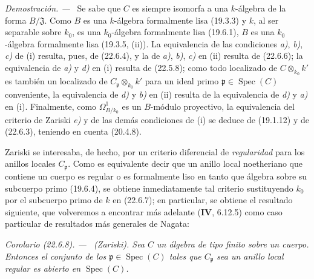 \documentclass[10pt,oneside]{book}
\makeatletter
\newcommand{\setmanualcurrentlabel}[1]{\def\@currentlabel{#1}}
\newenvironment{corollary}[1][]{%
  \setmanualcurrentlabel{#1}\par\medskip\noindent\itshape Corolario (#1). ---\ }{\par}
\newenvironment{proof}{%
  \par\medskip\noindent\textit{Demostración. ---\ }}{\par}
\makeatother
\begin{document}
\begin{proof}
Se sabe que $C$ es siempre isomorfa a una $k$-álgebra de la forma
$B/\mathfrak J$. Como $B$ es una $k$-álgebra formalmente lisa (19.3.3) y
$k$, al ser separable sobre $k_0$, es una $k_0$-álgebra formalmente lisa
(19.6.1), $B$ es una $k_0$-álgebra formalmente lisa (19.3.5, (ii)).
La equivalencia de las condiciones \emph{a)}, \emph{b)}, \emph{c)} de (i) resulta, pues, de (22.6.4), y
la de \emph{a)}, \emph{b)}, \emph{c)} en (ii) resulta de (22.6.6); la equivalencia de \emph{a)} y \emph{d)}
en (i) resulta de (22.5.8); como todo localizado de $C\otimes_{k_0}k'$ es
también un localizado de $C_{\mathfrak p}\otimes_{k_0}k'$ para un ideal primo
$\mathfrak p\in\operatorname{Spec}(C)$ conveniente, la equivalencia de \emph{d)} y \emph{b)} en (ii)
resulta de la equivalencia de \emph{d)} y \emph{a)} en (i). Finalmente, como
$\Omega^1_{B/k_0}$ es un $B$-módulo proyectivo, la equivalencia del criterio de
Zariski \emph{e)} y de las demás condiciones de (i) se deduce de (19.1.12) y de
(22.6.3), teniendo en cuenta (20.4.8).
\end{proof}

Zariski se interesaba, de hecho, por un criterio diferencial de \emph{regularidad} para los
anillos locales $C_{\mathfrak p}$. Como es equivalente decir que un anillo
local noetheriano que contiene un cuerpo es regular o es formalmente liso en
tanto que álgebra sobre su subcuerpo primo (19.6.4), se obtiene inmediatamente tal
criterio sustituyendo $k_0$ por el subcuerpo primo de $k$ en (22.6.7); en
particular, se obtiene el resultado siguiente, que volveremos a encontrar más adelante
(\textbf{IV}, 6.12.5) como caso particular de resultados más generales de Nagata:

\begin{corollary}[22.6.8]
\label{0.22.6.8-es}
\textnormal{(Zariski).}
Sea $C$ un álgebra de tipo finito sobre un cuerpo. Entonces el conjunto de los
$\mathfrak p\in\operatorname{Spec}(C)$ tales que $C_{\mathfrak p}$ sea un anillo local
regular es \textup{abierto} en $\operatorname{Spec}(C)$.
\end{corollary}
\end{document}
